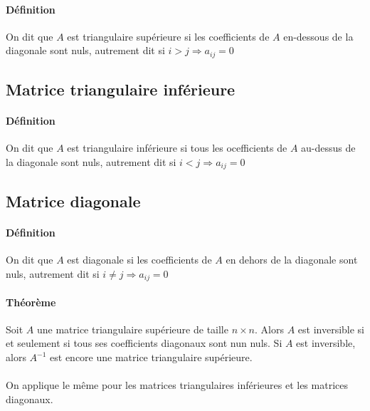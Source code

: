 \paragraph{Définition} On dit que $A$ est triangulaire supérieure si les coefficients de $A$ en-dessous de la diagonale sont nuls, autrement dit si $i > j \Rightarrow a_{ij} = 0$

%
\subsection{Matrice triangulaire inférieure}
%
\paragraph{Définition} On dit que $A$ est triangulaire inférieure si tous les ocefficients de $A$ au-dessus de la diagonale sont nuls, autrement dit si $i < j \Rightarrow a_{ij} = 0$

%
\subsection{Matrice diagonale}
%
\paragraph{Définition} On dit que $A$ est diagonale si les coefficients de $A$ en dehors de la diagonale sont nuls, autrement dit si $i\neq j \Rightarrow a_{ij} = 0$

\paragraph{Théorème} Soit $A$ une matrice triangulaire supérieure de taille $n\times n$. Alors $A$ est inversible si et seulement si tous ses coefficients diagonaux sont nun nuls. Si $A$ est inversible, alors $A^{-1}$ est encore une matrice triangulaire supérieure.
\\\\
On applique le même pour les matrices triangulaires inférieures et les matrices diagonaux.

